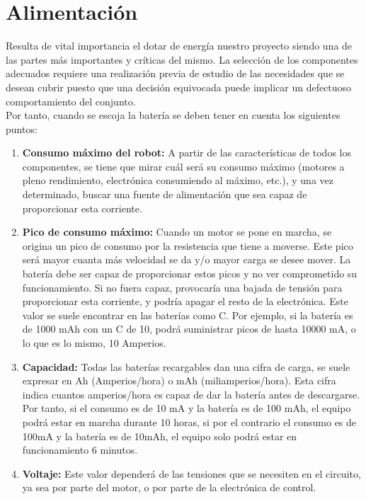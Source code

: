 \section{Alimentación}
\label{sub:alimentación}

Resulta de vital importancia el dotar de energía nuestro proyecto siendo una de las partes más importantes y críticas del mismo. La selección de los componentes adecuados
requiere una realización previa de estudio de las necesidades que se desean cubrir puesto que una decisión equivocada puede implicar un defectuoso
comportamiento del conjunto.\\

Por tanto, cuando se escoja la batería se deben tener en cuenta los siguientes puntos:\\

\begin{enumerate}

 \item \textbf{Consumo máximo del robot:} A partir de las características de todos los
componentes, se tiene que mirar cuál será su consumo máximo (motores a pleno
rendimiento, electrónica consumiendo al máximo, etc.), y una vez determinado,
buscar una fuente de alimentación que sea capaz de proporcionar esta corriente.

\item \textbf{Pico de consumo máximo:} Cuando un motor se pone en marcha, se origina un
pico de consumo por la resistencia que tiene a moverse. Este pico será mayor
cuanta más velocidad se da y/o mayor carga se desee mover. La batería debe ser
capaz de proporcionar estos picos y no ver comprometido su funcionamiento. Si no
fuera capaz, provocaría una bajada de tensión para proporcionar esta corriente, y
podría apagar el resto de la electrónica. Este valor se suele encontrar en las
baterías como C. Por ejemplo, si la batería es de 1000 mAh con un C de 10, podrá
suministrar picos de hasta 10000 mA, o lo que es lo mismo, 10 Amperios.


\item \textbf{Capacidad:} Todas las baterías recargables dan una cifra de carga, se suele
expresar en Ah (Amperios/hora) o mAh (miliamperios/hora). Esta cifra indica
cuantos amperios/hora es capaz de dar la batería antes de descargarse. Por tanto,
si el consumo es de 10 mA y la batería es de 100 mAh, el equipo podrá estar en
marcha durante 10 horas, si por el contrario el consumo es de 100mA y la batería
es de 10mAh, el equipo solo podrá estar en funcionamiento 6 minutos.

\item \textbf{Voltaje:} Este valor dependerá de las tensiones que se necesiten en el circuito, ya
sea por parte del motor, o por parte de la electrónica de control.

\end{enumerate}

